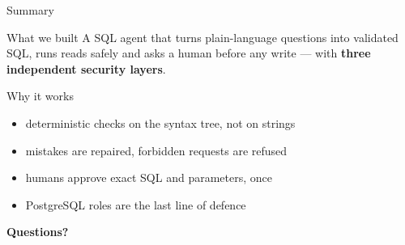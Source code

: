 \documentclass[aspectratio=169,10pt]{beamer}
\begin{document}
\begin{frame}{Summary}
  \begin{block}{What we built}
    A SQL agent that turns plain-language questions into validated SQL, runs reads
    safely and asks a human before any write --- with \textbf{three independent
    security layers}.
  \end{block}

  \begin{block}{Why it works}
    \begin{itemize}
      \item deterministic checks on the syntax tree, not on strings
      \item mistakes are repaired, forbidden requests are refused
      \item humans approve exact SQL and parameters, once
      \item PostgreSQL roles are the last line of defence
    \end{itemize}
  \end{block}

  \centering\Large\bfseries Questions?
\end{frame}
\end{document}
